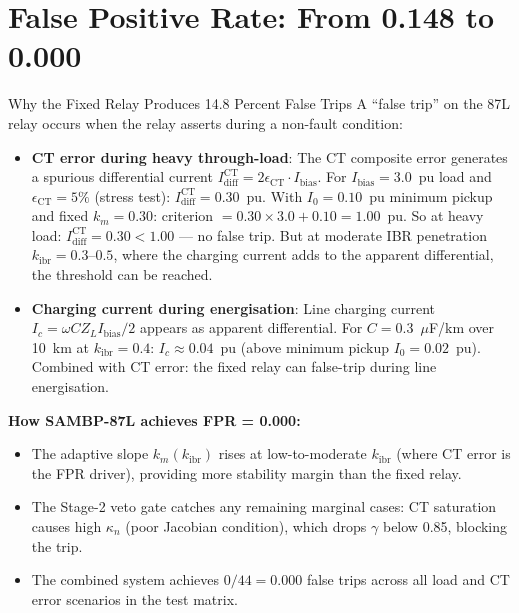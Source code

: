 \documentclass[12pt,a4paper]{article}
\newcommand{\kibr}{k_\mathrm{ibr}}
\begin{document}
\section{False Positive Rate: From 0.148 to 0.000}

\begin{resultbox}{Why the Fixed Relay Produces 14.8 Percent False Trips}
A ``false trip'' on the 87L relay occurs when the relay asserts during a non-fault condition:
\begin{itemize}[nosep]
  \item \textbf{CT error during heavy through-load}: The CT composite error generates a spurious differential current $I_\mathrm{diff}^\mathrm{CT} = 2\epsilon_\mathrm{CT} \cdot I_\mathrm{bias}$. For $I_\mathrm{bias} = 3.0$~pu load and $\epsilon_\mathrm{CT} = 5\%$ (stress test): $I_\mathrm{diff}^\mathrm{CT} = 0.30$~pu. With $I_0 = 0.10$~pu minimum pickup and fixed $k_m = 0.30$: criterion $= 0.30 \times 3.0 + 0.10 = 1.00$~pu. So at heavy load: $I_\mathrm{diff}^\mathrm{CT} = 0.30 < 1.00$ --- no false trip. But at moderate IBR penetration $\kibr = 0.3$--$0.5$, where the charging current adds to the apparent differential, the threshold can be reached.
  \item \textbf{Charging current during energisation}: Line charging current $I_c = \omega C Z_L I_\mathrm{bias}/2$ appears as apparent differential. For $C = 0.3$~$\mu$F/km over 10~km at $\kibr = 0.4$: $I_c \approx 0.04$~pu (above minimum pickup $I_0 = 0.02$~pu). Combined with CT error: the fixed relay can false-trip during line energisation.
\end{itemize}

\textbf{How SAMBP-87L achieves FPR = 0.000:}
\begin{itemize}[nosep]
  \item The adaptive slope $k_m(\kibr)$ rises at low-to-moderate $\kibr$ (where CT error is the FPR driver), providing more stability margin than the fixed relay.
  \item The Stage-2 veto gate catches any remaining marginal cases: CT saturation causes high $\kappa_n$ (poor Jacobian condition), which drops $\gamma$ below 0.85, blocking the trip.
  \item The combined system achieves $0/44 = 0.000$ false trips across all load and CT error scenarios in the test matrix.
\end{itemize}
\end{resultbox}
\end{document}
